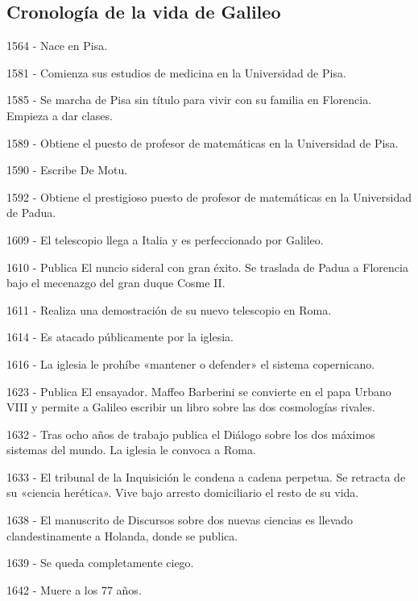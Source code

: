 \documentclass[letterpaper, 10pt, journal]{IEEEtran}
\begin{document}
\subsection{Cronolog\'ia de la vida de Galileo}
\begin{description}
    \item 1564 - Nace en Pisa.
    \item 1581 - Comienza sus estudios de medicina en la Universidad de Pisa.
    \item 1585 - Se marcha de Pisa sin t\'itulo para vivir con su familia en Florencia.
    Empieza a dar clases.
    \item 1589  - Obtiene el puesto de profesor de matem\'aticas en la Universidad de Pisa.
    \item 1590  - Escribe De Motu.
    \item 1592 - Obtiene el prestigioso puesto de profesor de matemáticas en la Universidad de Padua.
    \item 1609 - El telescopio llega a Italia y es perfeccionado por Galileo.
    \item 1610 - Publica El nuncio sideral con gran éxito. Se traslada de Padua a Florencia bajo el mecenazgo del gran duque Cosme II.
    \item 1611 - Realiza una demostración de su nuevo telescopio en Roma.
    \item 1614 - Es atacado públicamente por la iglesia.
    \item 1616 - La iglesia le prohíbe «mantener o defender» el sistema copernicano.
    \item 1623 - Publica El ensayador. Maffeo Barberini se convierte en el papa Urbano VIII y permite a Galileo escribir un libro sobre las dos cosmologías rivales.
    \item 1632 - Tras ocho años de trabajo publica el Diálogo sobre los dos máximos sistemas del mundo. La iglesia le convoca a Roma.
    \item 1633 - El tribunal de la Inquisición le condena a cadena perpetua. Se retracta de su «ciencia herética».
    Vive bajo arresto domiciliario el resto de su vida.
    \item 1638 - El manuscrito de Discursos sobre dos nuevas ciencias es llevado clandestinamente a Holanda, donde se publica.
    \item 1639 - Se queda completamente ciego.
    \item 1642 - Muere a los 77 años.
\end{description}
\end{document}
